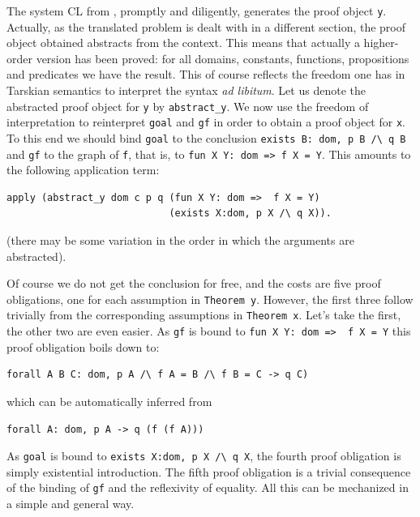 \documentclass[a4paper,11pt]{article}
\begin{document}
The system CL from \cite{Beze:Hend:05}, promptly and diligently, 
generates the proof object \verb|y|. 
Actually, as the translated problem is dealt with in a different section,
the proof object obtained abstracts from the context. This means that actually
a higher-order version has been proved: for all domains, constants, 
functions, propositions and predicates we have the result. This of course
reflects the freedom one has in Tarskian semantics to interpret the
syntax \emph{ad libitum}. Let us denote the abstracted proof object
for \verb|y| by \verb|abstract_y|. We now use the freedom of interpretation
to reinterpret \verb|goal| and \verb|gf| in order to obtain a proof object
for \verb|x|. To this end we should bind \verb|goal| to the conclusion 
\verb|exists B: dom, p B /\ q B| and \verb|gf| to the graph of \verb|f|,
that is, to \verb|fun X Y: dom => f X = Y|. This amounts to the following
application term:
\begin{verbatim}
apply (abstract_y dom c p q (fun X Y: dom =>  f X = Y) 
                            (exists X:dom, p X /\ q X)).
\end{verbatim}  
(there may be some variation in the order in which the arguments are 
abstracted). 

Of course we do not get the conclusion for free, and the costs are
five proof obligations, one for each assumption in \verb|Theorem y|.
However, the first three follow trivially from the corresponding
assumptions in \verb|Theorem x|. Let's take the first, the other
two are even easier. As \verb|gf| is bound to 
\verb|fun X Y: dom =>  f X = Y| this proof obligation boils down to:
\begin{verbatim}
forall A B C: dom, p A /\ f A = B /\ f B = C -> q C) 
\end{verbatim}  
which can be automatically inferred from 
\begin{verbatim}
forall A: dom, p A -> q (f (f A))) 
\end{verbatim}
As \verb|goal| is bound to 
\verb|exists X:dom, p X /\ q X|, the fourth proof obligation
is simply existential introduction. The fifth proof obligation
is a trivial consequence of the binding of \verb|gf| and the 
reflexivity of equality. All this can be mechanized in a simple
and general way.
\end{document}
